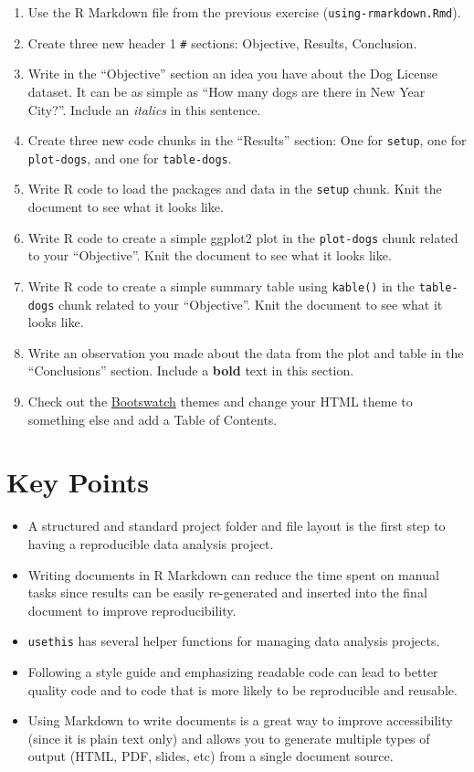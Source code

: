 \documentclass[]{Nemilov}
\providecommand{\tightlist}{%
  \setlength{\itemsep}{0pt}\setlength{\parskip}{0pt}}
\begin{document}
\begin{enumerate}
\def\labelenumi{\arabic{enumi}.}
\tightlist
\item
  Use the R Markdown file from the previous exercise (\texttt{using-rmarkdown.Rmd}).
\item
  Create three new header 1 \texttt{\#} sections: Objective, Results, Conclusion.
\item
  Write in the ``Objective'' section an idea you have about the Dog License dataset.
  It can be as simple as ``How many dogs are there in New Year City?''. Include an
  \emph{italics} in this sentence.
\item
  Create three new code chunks in the ``Results'' section: One for \texttt{setup}, one
  for \texttt{plot-dogs}, and one for \texttt{table-dogs}.
\item
  Write R code to load the packages and data in the \texttt{setup} chunk. Knit the document
  to see what it looks like.
\item
  Write R code to create a simple ggplot2 plot in the \texttt{plot-dogs} chunk related
  to your ``Objective''. Knit the document to see what it looks like.
\item
  Write R code to create a simple summary table using \texttt{kable()} in the
  \texttt{table-dogs} chunk related to your ``Objective''. Knit the document to see what it
  looks like.
\item
  Write an observation you made about the data from the plot and table in the
  ``Conclusions'' section. Include a \textbf{bold} text in this section.
\item
  Check out the \href{https://bootswatch.com/3/}{Bootswatch} themes and change your HTML theme to
  something else and add a Table of Contents.
\end{enumerate}

\hypertarget{r-reproducibility-keypoints}{%
\section{Key Points}\label{r-reproducibility-keypoints}}

\begin{itemize}
\tightlist
\item
  A structured and standard project folder and file layout
  is the first step to having a reproducible data analysis project.
\item
  Writing documents in R Markdown can reduce the time spent on manual tasks
  since results can be easily re-generated and inserted into the final document to improve reproducibility.
\item
  \texttt{usethis} has several helper functions for managing data analysis projects.
\item
  Following a style guide and emphasizing readable code can lead to better quality code
  and to code that is more likely to be reproducible and reusable.
\item
  Using Markdown to write documents is a great way to improve accessibility (since it is plain text only)
  and allows you to generate multiple types of output (HTML, PDF, slides, etc) from a single document source.
\end{itemize}
\end{document}
